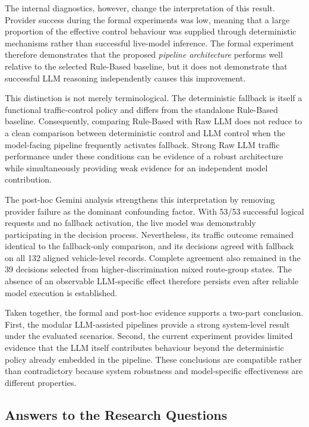\documentclass[letterpaper,10pt,conference]{ieeeconf}
\begin{document}
The internal diagnostics, however, change the interpretation of this result. Provider success during the formal experiments was low, meaning that a large proportion of the effective control behaviour was supplied through deterministic mechanisms rather than successful live-model inference. The formal experiment therefore demonstrates that the proposed \emph{pipeline architecture} performs well relative to the selected Rule-Based baseline, but it does not demonstrate that successful LLM reasoning independently causes this improvement.



This distinction is not merely terminological. The deterministic fallback is itself a functional traffic-control policy and differs from the standalone Rule-Based baseline. Consequently, comparing Rule-Based with Raw LLM does not reduce to a clean comparison between deterministic control and LLM control when the model-facing pipeline frequently activates fallback. Strong Raw LLM traffic performance under these conditions can be evidence of a robust architecture while simultaneously providing weak evidence for an independent model contribution.



The post-hoc Gemini analysis strengthens this interpretation by removing provider failure as the dominant confounding factor. With 53/53 successful logical requests and no fallback activation, the live model was demonstrably participating in the decision process. Nevertheless, its traffic outcome remained identical to the fallback-only comparison, and its decisions agreed with fallback on all 132 aligned vehicle-level records. Complete agreement also remained in the 39 decisions selected from higher-discrimination mixed route-group states. The absence of an observable LLM-specific effect therefore persists even after reliable model execution is established.



Taken together, the formal and post-hoc evidence supports a two-part conclusion. First, the modular LLM-assisted pipelines provide a strong system-level result under the evaluated scenarios. Second, the current experiment provides limited evidence that the LLM itself contributes behaviour beyond the deterministic policy already embedded in the pipeline. These conclusions are compatible rather than contradictory because system robustness and model-specific effectiveness are different properties.



\subsection{Answers to the Research Questions}
\end{document}
